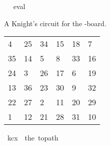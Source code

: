\begin{isabellebody}
\isadelimproof
\ %
\endisadelimproof
%
\isatagproof
{}\isamarkupfalse%
\ eval%
\endisatagproof
{\isafoldproof}%
%
\isadelimproof
%
\endisadelimproof
%
\begin{isamarkuptext}%
A Knight's circuit for the -board.
  \begin{table}[H]
    \begin{tabular}{llllll}
       4 & 25 & 34 & 15 & 18 &  7 \\
      35 & 14 &  5 &  8 & 33 & 16 \\
      24 &  3 & 26 & 17 &  6 & 19 \\
      13 & 36 & 23 & 30 &  9 & 32 \\
      22 & 27 &  2 & 11 & 20 & 29 \\
       1 & 12 & 21 & 28 & 31 & 10
    \end{tabular}
  \end{table}%
\end{isamarkuptext}\isamarkuptrue%
\isamarkupfalse%
\ {\isachardoublequoteopen}kc{}x{}\ {\isasymequiv}\ the\ {\isacharparenleft}{\kern0pt}to{\isacharunderscore}{\kern0pt}path\ \isanewline
\ \ {\isacharbrackleft}{\kern0pt}{\isacharbrackleft}{\kern0pt}{}{\isacharcomma}{\kern0pt}{}{}{\isacharcomma}{\kern0pt}{}{}{\isacharcomma}{\kern0pt}{}{}{\isacharcomma}{\kern0pt}{}{}{\isacharcomma}{\kern0pt}{}{\isacharbrackright}{\kern0pt}{\isacharcomma}{\kern0pt}\isanewline
\ \ {\isacharbrackleft}{\kern0pt}{}{}{\isacharcomma}{\kern0pt}{}{}{\isacharcomma}{\kern0pt}{}{\isacharcomma}{\kern0pt}{}{\isacharcomma}{\kern0pt}{}{}{\isacharcomma}{\kern0pt}{}{}{\isacharbrackright}{\kern0pt}{\isacharcomma}{\kern0pt}\isanewline
\ \ {\isacharbrackleft}{\kern0pt}{}{}{\isacharcomma}{\kern0pt}{}{\isacharcomma}{\kern0pt}{}{}{\isacharcomma}{\kern0pt}{}{}{\isacharcomma}{\kern0pt}{}{\isacharcomma}{\kern0pt}{}{}{\isacharbrackright}{\kern0pt}{\isacharcomma}{\kern0pt}\isanewline
\ \ {\isacharbrackleft}{\kern0pt}{}{}{\isacharcomma}{\kern0pt}{}{}{\isacharcomma}{\kern0pt}{}{}{\isacharcomma}{\kern0pt}{}{}{\isacharcomma}{\kern0pt}{}{\isacharcomma}{\kern0pt}{}{}{\isacharbrackright}{\kern0pt}{\isacharcomma}{\kern0pt}\isanewline

\end{isabellebody}
